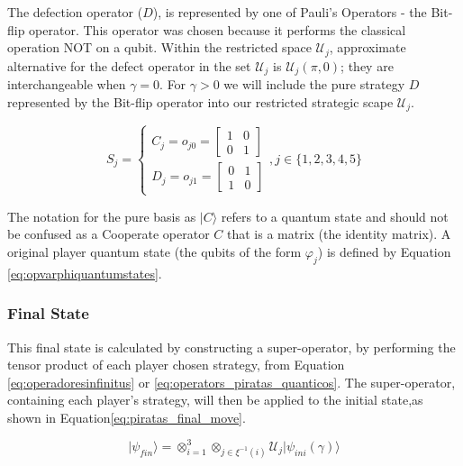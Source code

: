 \documentclass[10pt,twocolumn]{llncs}
\begin{document}
The defection operator ($D$), is represented by one of Pauli's Operators - the Bit-flip operator. This operator was chosen because it performs the classical operation NOT on a qubit. 
Within the restricted space $\mathcal{U}_{j}$, approximate alternative for the defect operator in the set $\mathcal{U}_{j}$ is $\mathcal{U}_{j}(\pi, 0)$; they are interchangeable when $\gamma = 0$. For $\gamma >0$ we will include the pure strategy $D$ represented by the Bit-flip operator into our restricted strategic scape $\mathcal{U}_{j}$.



\begin{equation}
S_{j} = \begin{cases}
C_{j} = o_{j0}=\left[\begin{array}{cc}
1 & 0\\
0 & 1
\end{array}\right]\\
D_{j} = o_{j1}=\left[\begin{array}{cc}
0 & 1\\
1 & 0
\end{array}\right]
\end{cases} , j \in \{ 1, 2, 3, 4, 5 \}
\label{eq:operators_piratas_quanticos}
\end{equation}






The notation for the pure basis as $\vert C\rangle$ refers to a quantum state and should not be confused as a Cooperate operator $C$ that is a matrix (the identity matrix). A original player quantum state (the qubits of the form $\varphi_{j}$) is defined by Equation \ref{eq:opvarphiquantumstates}.





\subsubsection{Final State}
\label{subsec:pirates_finalstate}


This final state is calculated by constructing a super-operator, by performing the tensor product of each player chosen strategy, from Equation \ref{eq:operadoresinfinitus} or \ref{eq:operators_piratas_quanticos}. The super-operator, containing each player's strategy, will then be applied to the initial state,as shown in Equation\ref{eq:piratas_final_move}.

\begin{equation}
\vert\psi_{fin}\rangle=\otimes_{i=1}^{3}\otimes_{j\in\xi^{-1}(i)}\mathcal{U}_{j}\vert\psi_{ini}(\gamma)\rangle
\label{eq:piratas_final_move}
\end{equation}
\end{document}
